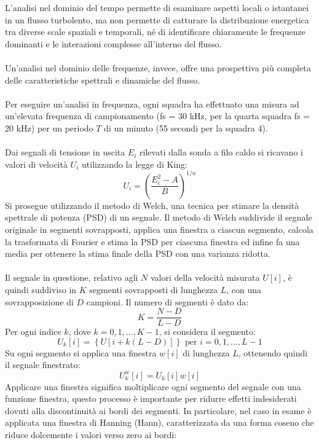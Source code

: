 \noindent L'analisi nel dominio del tempo permette di esaminare aspetti locali o istantanei in un flusso turbolento, ma non permette di catturare la distribuzione energetica tra diverse scale spaziali e temporali, né di identificare chiaramente le frequenze dominanti e le interazioni complesse all'interno del flusso.\\\\
Un'analisi nel dominio delle frequenze, invece, offre una prospettiva più completa delle caratteristiche spettrali e dinamiche del flusso.\\\\
Per eseguire un'analisi in frequenza, ogni squadra ha effettuato una misura ad un'elevata frequenza di campionamento (fs = 30 kHz, per la quarta squadra fs = 20 kHz) per un periodo $T$ di un minuto (55 secondi per la squadra 4).\\\\
Dai segnali di tensione in uscita $E_i$ rilevati dalla sonda a filo caldo si ricavano i valori di velocità $U_i$ utilizzando la legge di King:
\begin{equation*}
    U_i = \left( \frac{E_i^2-A}B \right)^{1/n}
\end{equation*}
Si prosegue utilizzando il metodo di Welch, una tecnica per stimare la densità spettrale di potenza (PSD) di un segnale. Il metodo di Welch suddivide il segnale originale in segmenti sovrapposti, applica una finestra a ciascun segmento, calcola la trasformata di Fourier e stima la PSD per ciascuna finestra ed infine fa una media per ottenere la stima finale della PSD con una varianza ridotta.\\\\
Il segnale in questione, relativo agli $N$ valori della velocità misurata $U[i]$, è quindi suddiviso in $K$ segmenti sovrapposti di lunghezza $L$, con una sovrapposizione di $D$ campioni. Il numero di segmenti è dato da:
\begin{equation*}
    K = \frac{N-D}{L-D}
\end{equation*}
Per ogni indice $k$, dove $k=0,1,...,K-1$, si considera il segmento:
\begin{equation*}
    U_k[i] = \left\{U[i+k(L-D)]\right\} \text{ per } i=0,1,...,L-1
\end{equation*}
Su ogni segmento si applica una finestra $w[i]$ di lunghezza $L$, ottenendo quindi il segnale finestrato:
\begin{equation*}
    U_k^w[i] = U_k[i]w[i]
\end{equation*}
Applicare una finestra significa moltiplicare ogni segmento del segnale con una funzione finestra, questo processo è importante per ridurre effetti indesiderati dovuti alla discontinuità ai bordi dei segmenti. In particolare, nel caso in esame è applicata una finestra di Hanning (Hann), caratterizzata da una forma coseno che riduce dolcemente i valori verso zero ai bordi:
